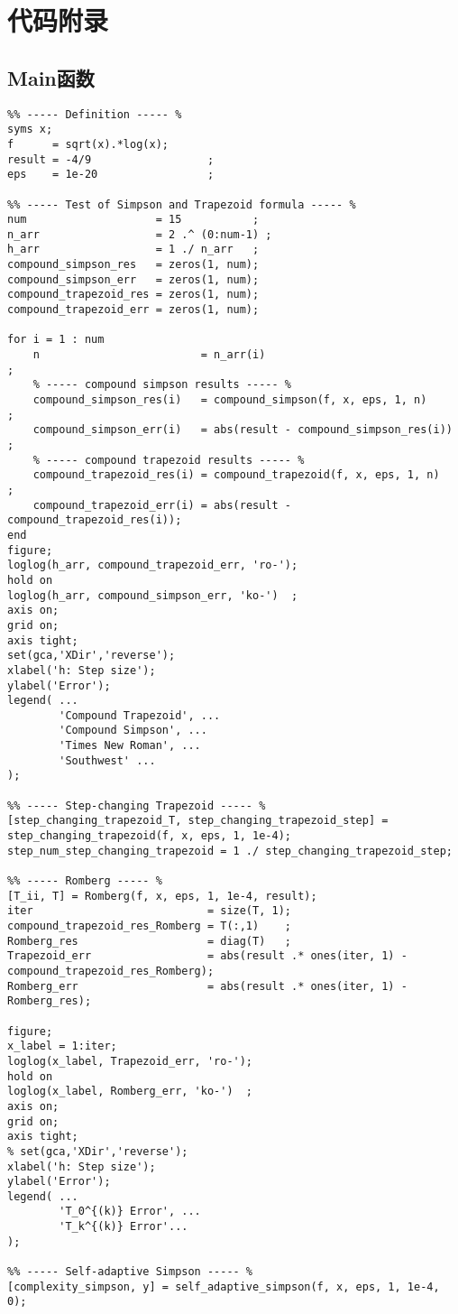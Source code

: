 
\chapter{代码附录}

\section*{Main函数}

\lstset{language=Matlab}

\begin{lstlisting}
%% ----- Definition ----- %
syms x;
f      = sqrt(x).*log(x);
result = -4/9                  ;
eps    = 1e-20                 ;

%% ----- Test of Simpson and Trapezoid formula ----- %
num                    = 15           ;
n_arr                  = 2 .^ (0:num-1) ;
h_arr                  = 1 ./ n_arr   ;
compound_simpson_res   = zeros(1, num);
compound_simpson_err   = zeros(1, num);
compound_trapezoid_res = zeros(1, num);
compound_trapezoid_err = zeros(1, num);

for i = 1 : num
    n                         = n_arr(i)                               ;
    % ----- compound simpson results ----- %
    compound_simpson_res(i)   = compound_simpson(f, x, eps, 1, n)      ;
    compound_simpson_err(i)   = abs(result - compound_simpson_res(i))  ;
    % ----- compound trapezoid results ----- %
    compound_trapezoid_res(i) = compound_trapezoid(f, x, eps, 1, n)    ;
    compound_trapezoid_err(i) = abs(result - compound_trapezoid_res(i));
end
figure;
loglog(h_arr, compound_trapezoid_err, 'ro-');
hold on
loglog(h_arr, compound_simpson_err, 'ko-')  ;
axis on;
grid on;
axis tight;
set(gca,'XDir','reverse');
xlabel('h: Step size');
ylabel('Error');
legend( ...
        'Compound Trapezoid', ...
        'Compound Simpson', ...
        'Times New Roman', ...
        'Southwest' ...
);

%% ----- Step-changing Trapezoid ----- %
[step_changing_trapezoid_T, step_changing_trapezoid_step] = step_changing_trapezoid(f, x, eps, 1, 1e-4);
step_num_step_changing_trapezoid = 1 ./ step_changing_trapezoid_step;

%% ----- Romberg ----- %
[T_ii, T] = Romberg(f, x, eps, 1, 1e-4, result);
iter                           = size(T, 1);
compound_trapezoid_res_Romberg = T(:,1)    ;
Romberg_res                    = diag(T)   ;
Trapezoid_err                  = abs(result .* ones(iter, 1) - compound_trapezoid_res_Romberg);
Romberg_err                    = abs(result .* ones(iter, 1) - Romberg_res);

figure;
x_label = 1:iter;
loglog(x_label, Trapezoid_err, 'ro-');
hold on
loglog(x_label, Romberg_err, 'ko-')  ;
axis on;
grid on;
axis tight;
% set(gca,'XDir','reverse');
xlabel('h: Step size');
ylabel('Error');
legend( ...
        'T_0^{(k)} Error', ...
        'T_k^{(k)} Error'...
);

%% ----- Self-adaptive Simpson ----- %
[complexity_simpson, y] = self_adaptive_simpson(f, x, eps, 1, 1e-4, 0);
\end{lstlisting}   

